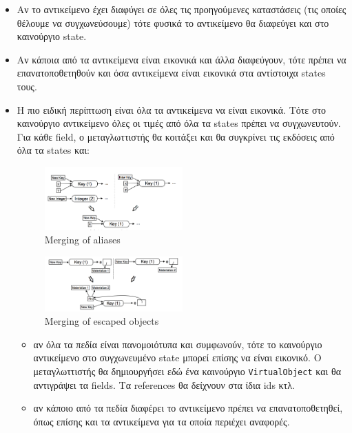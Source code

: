 \begin{itemize}

\item Αν το αντικείμενο έχει διαφύγει σε όλες τις προηγούμενες καταστάσεις (τις
οποίες θέλουμε να συγχωνεύσουμε) τότε φυσικά το αντικείμενο θα διαφεύγει και στο
καινούργιο state.

\item Αν κάποια από τα αντικείμενα είναι εικονικά και άλλα διαφεύγουν, τότε
πρέπει να επανατοποθετηθούν και όσα αντικείμενα είναι εικονικά στα αντίστοιχα
states τους.

\item Η πιο ειδική περίπτωση είναι όλα τα αντικείμενα να είναι εικονικά. Τότε
στο καινούργιο αντικείμενο όλες οι τιμές από όλα τα states πρέπει να
συγχωνευτούν. Για κάθε field, ο μεταγλωττιστής θα κοιτάξει και θα συγκρίνει τις
εκδόσεις από όλα τα states και:

\begin{figure}[h]
\centering
\includegraphics[width=0.5\textwidth]{merging-aliases.png}
\caption{Merging of aliases}
\label{figure-41}
\end{figure}

\begin{figure}[h]
\centering
\includegraphics[width=0.5\textwidth]{merging-escaped.png}
\caption{Merging of escaped objects}
\label{figure-42}
\end{figure}

\begin{itemize}

\item αν όλα τα πεδία είναι πανομοιότυπα και συμφωνούν, τότε το καινούργιο
αντικείμενο στο συγχωνευμένο state μπορεί επίσης να είναι εικονικό. Ο
μεταγλωττιστής θα δημιουργήσει εδώ ένα καινούργιο \texttt{VirtualObject} και θα
αντιγράψει τα fields. Τα references θα δείχνουν στα ίδια ids κτλ.

\item αν κάποιο από τα πεδία διαφέρει το αντικείμενο πρέπει να επανατοποθετηθεί,
όπως επίσης και τα αντικείμενα για τα οποία περιέχει αναφορές.

\end{itemize}
\end{itemize}

